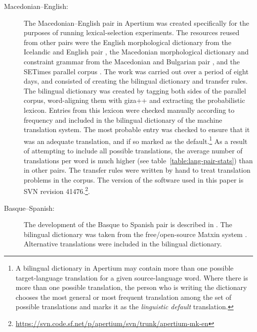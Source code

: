 \documentclass[11pt]{article}
\newcommand{\comment}[1]{\todo{#1}}
\begin{document}
\begin{description}
\item[Macedonian--English:] The Macedonian--English pair
  in Apertium was created specifically for the purposes of running
  lexical-selection experiments. The resources reused from other pairs
  were the English morphological dictionary from the Icelandic and
  English pair \citep{brandt11}, the Macedonian morphological
  dictionary and constraint grammar from the Macedonian and Bulgarian
  pair \citep{rangelov11}, and the SETimes parallel corpus
  \citep{tyers10}.  The work was carried out over a period of eight
  days, and consisted of creating the bilingual dictionary and
  transfer rules. The bilingual dictionary was created by tagging both
  sides of the parallel corpus, word-aligning them with {\sc giza++}
  \citep{och03a} and extracting the probabilistic lexicon. Entries
  from this lexicon were checked manually according to frequency and
  included in the bilingual dictionary of the machine translation
  system. The most probable entry was checked to ensure that it was 
  an adequate translation, and if so marked as the 
  default.\footnote{A bilingual dictionary in Apertium
    \citep{forcada2011apertium} may contain more than one possible
    target-language translation for a given source-language
    word. Where there is more than one possible translation, the
    person who is writing the dictionary chooses the most general or
    most frequent translation among the set of possible translations
    and marks it as the \emph{linguistic default} translation.} As a
  result of attempting to include all possible translations, the
  average number of translations per word is much higher (see table~\ref{table:lang-pair-stats})
than in other pairs.  The transfer rules were written
  by hand to treat translation problems in the corpus. The version of
  the software used in this paper is SVN revision
  41476.\footnote{\url{https://svn.code.sf.net/p/apertium/svn/trunk/apertium-mk-en}}.
\item[Basque--Spanish:] The development of the Basque to Spanish pair
  is described in \cite{ginesti09}. The bilingual dictionary was taken
  from the free/open-source Matxin system \citep{mayor2011}. 
  Alternative translations were included in the bilingual
  dictionary.%


\end{description}
\end{document}
